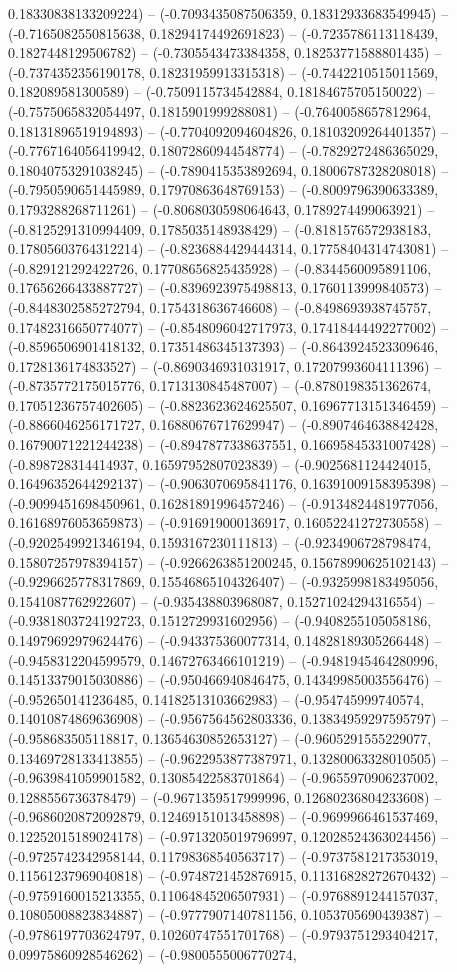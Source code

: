 0.18330838133209224) -- (-0.7093435087506359, 0.18312933683549945) -- (-0.7165082550815638, 0.18294174492691823) -- (-0.7235786113118439, 0.1827448129506782) -- (-0.7305543473384358, 0.18253771588801435) -- (-0.7374352356190178, 0.18231959913315318) -- (-0.7442210515011569, 0.182089581300589) -- (-0.7509115734542884, 0.18184675705150022) -- (-0.7575065832054497, 0.1815901999288081) -- (-0.7640058657812964, 0.18131896519194893) -- (-0.7704092094604826, 0.18103209264401357) -- (-0.7767164056419942, 0.18072860944548774) -- (-0.7829272486365029, 0.18040753291038245) -- (-0.7890415353892694, 0.18006787328208018) -- (-0.7950590651445989, 0.17970863648769153) -- (-0.8009796390633389, 0.1793288268711261) -- (-0.8068030598064643, 0.1789274499063921) -- (-0.8125291310994409, 0.1785035148938429) -- (-0.8181576572938183, 0.17805603764312214) -- (-0.8236884429444314, 0.17758404314743081) -- (-0.829121292422726, 0.17708656825435928) -- (-0.8344560095891106, 0.17656266433887727) -- (-0.8396923975498813, 0.1760113999840573) -- (-0.8448302585272794, 0.1754318636746608) -- (-0.8498693938745757, 0.17482316650774077) -- (-0.8548096042717973, 0.17418444492277002) -- (-0.8596506901418132, 0.17351486345137393) -- (-0.8643924523309646, 0.1728136174833527) -- (-0.8690346931031917, 0.17207993604111396) -- (-0.8735772175015776, 0.1713130845487007) -- (-0.8780198351362674, 0.17051236757402605) -- (-0.8823623624625507, 0.16967713151346459) -- (-0.8866046256171727, 0.16880676717629947) -- (-0.8907464638842428, 0.16790071221244238) -- (-0.8947877338637551, 0.16695845331007428) -- (-0.898728314414937, 0.16597952807023839) -- (-0.9025681124424015, 0.16496352644292137) -- (-0.9063070695841176, 0.16391009158395398) -- (-0.9099451698450961, 0.16281891996457246) -- (-0.9134824481977056, 0.16168976053659873) -- (-0.916919000136917, 0.16052241272730558) -- (-0.9202549921346194, 0.1593167230111813) -- (-0.9234906728798474, 0.15807257978394157) -- (-0.9266263851200245, 0.15678990625102143) -- (-0.9296625778317869, 0.15546865104326407) -- (-0.9325998183495056, 0.1541087762922607) -- (-0.935438803968087, 0.15271024294316554) -- (-0.9381803724192723, 0.1512729931602956) -- (-0.9408255105058186, 0.14979692979624476) -- (-0.943375360077314, 0.14828189305266448) -- (-0.9458312204599579, 0.14672763466101219) -- (-0.9481945464280996, 0.14513379015030886) -- (-0.950466940846475, 0.14349985003556476) -- (-0.952650141236485, 0.14182513103662983) -- (-0.954745999740574, 0.14010874869636908) -- (-0.9567564562803336, 0.13834959297595797) -- (-0.958683505118817, 0.13654630852653127) -- (-0.9605291555229077, 0.13469728133413855) -- (-0.9622953877387971, 0.13280063328010505) -- (-0.9639841059901582, 0.13085422583701864) -- (-0.9655970906237002, 0.1288556736378479) -- (-0.9671359517999996, 0.12680236804233608) -- (-0.9686020872092879, 0.12469151013458898) -- (-0.9699966461537469, 0.12252015189024178) -- (-0.9713205019796997, 0.12028524363024456) -- (-0.9725742342958144, 0.11798368540563717) -- (-0.9737581217353019, 0.11561237969040818) -- (-0.9748721452876915, 0.11316828272670432) -- (-0.9759160015213355, 0.11064845206507931) -- (-0.9768891244157037, 0.10805008823834887) -- (-0.9777907140781156, 0.1053705690439387) -- (-0.9786197703624797, 0.10260747551701768) -- (-0.9793751293404217, 0.09975860928546262) -- (-0.9800555006770274, 